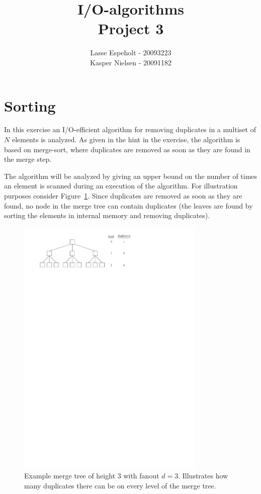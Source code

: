 \documentclass[a4paper,12pt]{article}
\begin{document}
\title{I/O-algorithms\\Project 3}

\author{Lasse Espeholt - 20093223\\
Kasper Nielsen - 20091182\\}

\maketitle

\pagebreak{}\tableofcontents{}\pagebreak{}

\section{Sorting}
In this exercise an I/O-efficient algorithm for removing duplicates in a multiset of $N$ elements is analyzed. As given in the hint in the exercise, the algorithm is based on merge-sort, where duplicates are removed as soon as they are found in the merge step.

The algorithm will be analyzed by giving an upper bound on the number of times an element is scanned during an execution of the algorithm. For illustration purposes consider Figure~\ref{fig:sorting:mergetree}. Since duplicates are removed as soon as they are found, no node in the merge tree can contain duplicates (the leaves are found by sorting the elements in internal memory and removing duplicates).

\begin{figure}[h!]
  \centering
  \includegraphics[width=0.8\textwidth]{images/mergetree}
  \caption{Example merge tree of height $3$ with fanout $d = 3$. Illustrates how many duplicates there can be on every level of the merge tree.}
  \label{fig:sorting:mergetree}
\end{figure}
\end{document}
